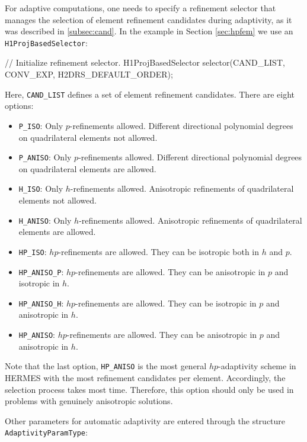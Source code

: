 \documentclass[final,3p,times,twocolumn]{elsarticle}
\begin{document}
For adaptive computations, one needs to specify a refinement 
selector that manages the selection of element refinement 
candidates during adaptivity, as it was described in 
\ref{subsec:cand}. In the example in Section 
\ref{sec:hpfem} we use an {\tt H1ProjBasedSelector}:

\begin{code}
  // Initialize refinement selector.
  H1ProjBasedSelector selector(CAND_LIST, CONV_EXP, 
                               H2DRS_DEFAULT_ORDER);
\end{code}
Here, {\tt CAND\_LIST} defines a set of element refinement candidates.
There are eight options:
\begin{itemize}
\item {\tt P\_ISO}: Only $p$-refinements allowed. Different directional 
      polynomial degrees on quadrilateral elements not allowed. 
\item {\tt P\_ANISO}: Only $p$-refinements allowed. Different directional 
      polynomial degrees on quadrilateral elements are allowed. 
\item {\tt H\_ISO}: Only $h$-refinements allowed. Anisotropic refinements
      of quadrilateral elements not allowed. 
\item {\tt H\_ANISO}: Only $h$-refinements allowed. Anisotropic refinements
      of quadrilateral elements are allowed. 
\item {\tt HP\_ISO}: $hp$-refinements are allowed. They can be isotropic 
      both in $h$ and $p$.
\item {\tt HP\_ANISO\_P}: $hp$-refinements are allowed. They can be anisotropic 
      in $p$ and isotropic in $h$.
\item {\tt HP\_ANISO\_H}: $hp$-refinements are allowed. They can be isotropic 
      in $p$ and anisotropic in $h$.
\item {\tt HP\_ANISO}: $hp$-refinements are allowed. They can be anisotropic 
      in $p$ and anisotropic in $h$. 
\end{itemize}
Note that the last option, {\tt HP\_ANISO} is the most general $hp$-adaptivity
scheme in HERMES with the most refinement candidates per element. Accordingly,
the selection process takes most time. Therefore, this option should only be 
used in problems with genuinely anisotropic solutions. 

Other parameters for automatic adaptivity are entered through the 
structure {\tt AdaptivityParamType}:
\end{document}
